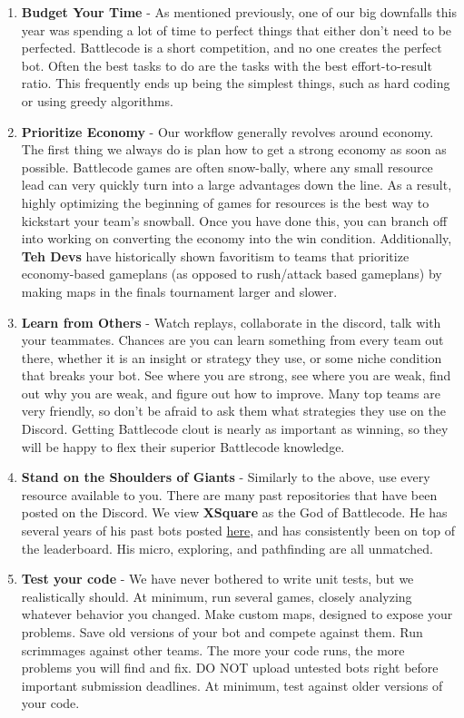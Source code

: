 \begin{enumerate}
\begin{itemize}
    
  \end{itemize}
  \item \textbf{Budget Your Time} - As mentioned previously, one of our big downfalls this year was spending a lot of time to perfect things that either don't need to be perfected. Battlecode is a short competition, and no one creates the perfect bot. Often the best tasks to do are the tasks with the best effort-to-result ratio. This frequently ends up being the simplest things, such as hard coding or using greedy algorithms.
  \item \textbf{Prioritize Economy} - Our workflow generally revolves around economy. The first thing we always do is plan how to get a strong economy as soon as possible. Battlecode games are often snow-bally, where any small resource lead can very quickly turn into a large advantages down the line. As a result, highly optimizing the beginning of games for resources is the best way to kickstart your team's snowball. Once you have done this, you can branch off into working on converting the economy into the win condition. Additionally, \textbf{Teh Devs} have historically shown favoritism to teams that prioritize economy-based gameplans (as opposed to rush/attack based gameplans) by making maps in the finals tournament larger and slower.
  \item \textbf{Learn from Others} - Watch replays, collaborate in the discord, talk with your teammates. Chances are you can learn something from every team out there, whether it is an insight or strategy they use, or some niche condition that breaks your bot. See where you are strong, see where you are weak, find out why you are weak, and figure out how to improve. Many top teams are very friendly, so don't be afraid to ask them what strategies they use on the Discord. Getting Battlecode clout is nearly as important as winning, so they will be happy to flex their superior Battlecode knowledge.
  \item \textbf{Stand on the Shoulders of Giants} - Similarly to the above, use every resource available to you. There are many past repositories that have been posted on the Discord. We view \textbf{XSquare} as the God of Battlecode. He has several years of his past bots posted \href{https://github.com/IvanGeffner}{here}, and has consistently been on top of the leaderboard. His micro, exploring, and pathfinding are all unmatched.
  \item \textbf{Test your code} - We have never bothered to write unit tests, but we realistically should. At minimum, run several games, closely analyzing whatever behavior you changed. Make custom maps, designed to expose your problems. Save old versions of your bot and compete against them. Run scrimmages against other teams. The more your code runs, the more problems you will find and fix. DO NOT upload untested bots right before important submission deadlines. At minimum, test against older versions of your code.
\end{enumerate}

